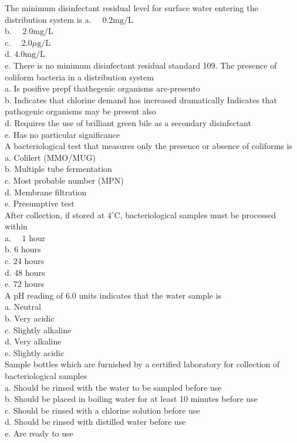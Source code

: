 The minimum disinfectant residual level for surface water entering the distribution system is a. $\quad 0.2 \mathrm{mg} / \mathrm{L}$\\
b. $\quad 2.0 \mathrm{mg} / \mathrm{L}$\\
c. $\quad 2.0 \mu \mathrm{g} / \mathrm{L}$\\
d. $4.0 \mathrm{mg} / \mathrm{L}$\\
e. There is no minimum disinfectant residual standard 109. The presence of coliform bacteria in a distribution system\\
a. Is posifive prepf thathegenic organisms are-presento\\
b. Indicates that chlorine demand has increased dramatically Indicates that pathogenic organisms may be present also\\
d. Requires the use of brilliant green bile as a secondary disinfectant\\
e. Has no particular significance\\

A bacteriological test that measures only the presence or absence of coliforms is\\
a. Colilert (MMO/MUG)\\
b. Multiple tube fermentation\\
c. Most probable number (MPN)\\
d. Membrane filtration\\
e. Presumptive test\\

After collection, if stored at $4^{\circ} \mathrm{C}$, bacteriological samples must be processed within\\
a. $\quad 1$ hour\\
b. 6 hours\\
c. 24 hours\\
d. 48 hours\\
e. 72 hours\\

A pH reading of $6.0$ units indicates that the water sample is\\
a. Neutral\\
b. Very acidic\\
c. Slightly alkaline\\
d. Very alkaline\\
e. Slightly acidic\\

Sample bottles which are furnished by a certified laboratory for collection of bacteriological samples\\
a. Should be rinsed with the water to be sampled before use\\
b. Should be placed in boiling water for at least 10 minutes before use\\
c. Should be rinsed with a chlorine solution before use\\
d. Should be rinsed with distilled water before use\\
e. Are ready to use\\

